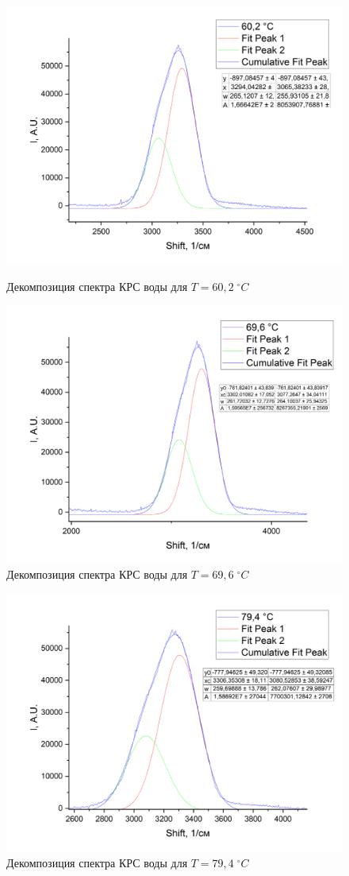 \documentclass{article}
\begin{document}
\begin{figure}[!htb]
                 \includegraphics[width=\linewidth]{Images/Вода; 60,2.png}
                 \caption{Декомпозиция спектра КРС воды для $T = 60,2\; ^{\circ}C$}
                  \endminipage\hfill
                 \includegraphics[width=\linewidth]{Images/Вода; 69,6.png}
                 \caption{Декомпозиция спектра КРС воды для $T = 69,6 \; ^{\circ}C$}
                  \endminipage
\end{figure}

\begin{figure}[h!]
\centering
    \includegraphics[width=0.6\linewidth]{Images/Вода; 79,4.png}
    \caption{Декомпозиция спектра КРС воды для $T = 79,4\; ^{\circ}C$}
\end{figure}
\end{document}
